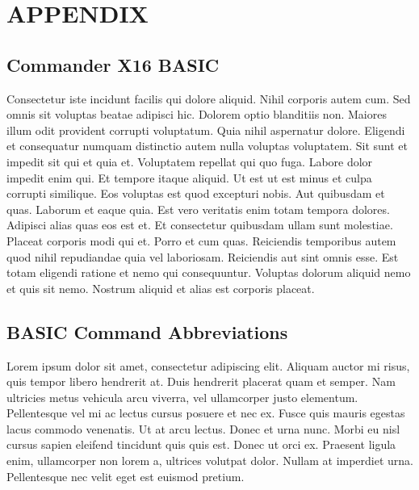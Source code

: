\documentclass[
	11pt, %
	fleqn, %
	letterpaper, %
]{CommodoreBlueBook}
\begin{document}





\makeatletter\@openrightfalse
\part{APPENDIX}


\chapter{Commander X16 BASIC}

Consectetur iste incidunt facilis qui dolore aliquid. Nihil corporis autem cum.
	Sed omnis sit voluptas beatae adipisci hic. Dolorem optio blanditiis non.
	Maiores illum odit provident corrupti voluptatum. Quia nihil aspernatur
	dolore. Eligendi et consequatur numquam distinctio autem nulla voluptas
	voluptatem. Sit sunt et impedit sit qui et quia et. Voluptatem repellat qui
	quo fuga. Labore dolor impedit enim qui. Et tempore itaque aliquid. Ut est
	ut est minus et culpa corrupti similique. Eos voluptas est quod excepturi
	nobis. Aut quibusdam et quas. Laborum et eaque quia. Est vero veritatis
	enim totam tempora dolores. Adipisci alias quas eos est et. Et consectetur
	quibusdam ullam sunt molestiae. Placeat corporis modi qui et. Porro et cum
	quas. Reiciendis temporibus autem quod nihil repudiandae quia vel
	laboriosam. Reiciendis aut sint omnis esse. Est totam eligendi ratione et
	nemo qui consequuntur. Voluptas dolorum aliquid nemo et quis sit nemo.
	Nostrum aliquid et alias est corporis placeat.


\chapter{BASIC Command Abbreviations}

Lorem ipsum dolor sit amet, consectetur adipiscing elit. Aliquam auctor mi
	risus, quis tempor libero hendrerit at. Duis hendrerit placerat quam et
	semper. Nam ultricies metus vehicula arcu viverra, vel ullamcorper justo
	elementum. Pellentesque vel mi ac lectus cursus posuere et nec ex. Fusce
	quis mauris egestas lacus commodo venenatis. Ut at arcu lectus. Donec et
	urna nunc. Morbi eu nisl cursus sapien eleifend tincidunt quis quis est.
	Donec ut orci ex. Praesent ligula enim, ullamcorper non lorem a, ultrices
	volutpat dolor. Nullam at imperdiet urna. Pellentesque nec velit eget est
	euismod pretium.
\end{document}
